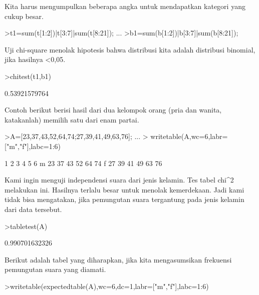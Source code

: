 \documentclass[a4paper,10pt]{article}
\begin{document}
\begin{eulernotebook}
\begin{eulercomment}
\begin{eulercomment}
\begin{eulercomment}
\begin{eulercomment}
\begin{eulercomment}
\begin{eulercomment}
\begin{eulercomment}
\begin{eulercomment}
\begin{eulercomment}
\begin{eulercomment}
\begin{eulercomment}
\begin{eulercomment}
\begin{eulercomment}
\begin{eulercomment}
\begin{eulercomment}
\begin{eulercomment}
\begin{eulercomment}
\begin{eulercomment}
\begin{eulercomment}
Kita harus mengumpulkan beberapa angka untuk mendapatkan kategori yang
cukup besar.
\end{eulercomment}
\begin{eulerprompt}
>t1=sum(t[1:2])|t[3:7]|sum(t[8:21]); ...
>b1=sum(b[1:2])|b[3:7]|sum(b[8:21]);
\end{eulerprompt}
\begin{eulercomment}
Uji chi-square menolak hipotesis bahwa distribusi kita adalah
distribusi binomial, jika hasilnya \textless{}0,05.
\end{eulercomment}
\begin{eulerprompt}
>chitest(t1,b1)
\end{eulerprompt}
\begin{euleroutput}
  0.53921579764
\end{euleroutput}
\begin{eulercomment}
Contoh berikut berisi hasil dari dua kelompok orang (pria dan wanita,
katakanlah) memilih satu dari enam partai.
\end{eulercomment}
\begin{eulerprompt}
>A=[23,37,43,52,64,74;27,39,41,49,63,76];  ...
>  writetable(A,wc=6,labr=["m","f"],labc=1:6)
\end{eulerprompt}
\begin{euleroutput}
             1     2     3     4     5     6
       m    23    37    43    52    64    74
       f    27    39    41    49    63    76
\end{euleroutput}
\begin{eulercomment}
Kami ingin menguji independensi suara dari jenis kelamin. Tes tabel
chi\textasciicircum{}2 melakukan ini. Hasilnya terlalu besar untuk menolak kemerdekaan.
Jadi kami tidak bisa mengatakan, jika pemungutan suara tergantung pada
jenis kelamin dari data tersebut.
\end{eulercomment}
\begin{eulerprompt}
>tabletest(A)
\end{eulerprompt}
\begin{euleroutput}
  0.990701632326
\end{euleroutput}
\begin{eulercomment}
Berikut adalah tabel yang diharapkan, jika kita mengasumsikan
frekuensi pemungutan suara yang diamati.
\end{eulercomment}
\begin{eulerprompt}
>writetable(expectedtable(A),wc=6,dc=1,labr=["m","f"],labc=1:6)

\end{eulerprompt}
\end{eulercomment}
\end{eulercomment}
\end{eulercomment}
\end{eulercomment}
\end{eulercomment}
\end{eulercomment}
\end{eulercomment}
\end{eulercomment}
\end{eulercomment}
\end{eulercomment}
\end{eulercomment}
\end{eulercomment}
\end{eulercomment}
\end{eulercomment}
\end{eulercomment}
\end{eulercomment}
\end{eulercomment}
\end{eulercomment}
\end{eulernotebook}
\end{document}
